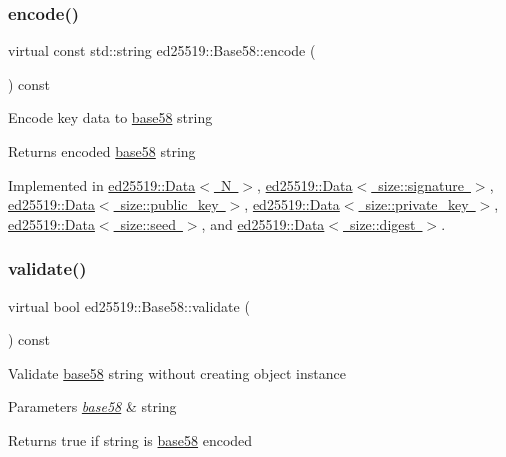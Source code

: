 \subsubsection{\texorpdfstring{encode()}{encode()}}
{\footnotesize\ttfamily virtual const std\+::string ed25519\+::\+Base58\+::encode (\begin{DoxyParamCaption}{ }\end{DoxyParamCaption}) const\hspace{0.3cm}{\ttfamily [pure virtual]}}

Encode key data to \mbox{\hyperlink{namespaceed25519_1_1base58}{base58}} string \begin{DoxyReturn}{Returns}
encoded \mbox{\hyperlink{namespaceed25519_1_1base58}{base58}} string 
\end{DoxyReturn}


Implemented in \mbox{\hyperlink{classed25519_1_1_data_a2dc2e23b950a10b168d7509a63ffca53}{ed25519\+::\+Data$<$ N $>$}}, \mbox{\hyperlink{classed25519_1_1_data_a2dc2e23b950a10b168d7509a63ffca53}{ed25519\+::\+Data$<$ size\+::signature $>$}}, \mbox{\hyperlink{classed25519_1_1_data_a2dc2e23b950a10b168d7509a63ffca53}{ed25519\+::\+Data$<$ size\+::public\+\_\+key $>$}}, \mbox{\hyperlink{classed25519_1_1_data_a2dc2e23b950a10b168d7509a63ffca53}{ed25519\+::\+Data$<$ size\+::private\+\_\+key $>$}}, \mbox{\hyperlink{classed25519_1_1_data_a2dc2e23b950a10b168d7509a63ffca53}{ed25519\+::\+Data$<$ size\+::seed $>$}}, and \mbox{\hyperlink{classed25519_1_1_data_a2dc2e23b950a10b168d7509a63ffca53}{ed25519\+::\+Data$<$ size\+::digest $>$}}.

\mbox{\label{classed25519_1_1_base58_addfdb1d6d0f7e7f0cd0cf5dd2ee193bb}} 
\subsubsection{\texorpdfstring{validate()}{validate()}}
{\footnotesize\ttfamily virtual bool ed25519\+::\+Base58\+::validate (\begin{DoxyParamCaption}{ }\end{DoxyParamCaption}) const\hspace{0.3cm}{\ttfamily [pure virtual]}}

Validate \mbox{\hyperlink{namespaceed25519_1_1base58}{base58}} string without creating object instance 
\begin{DoxyParams}{Parameters}
{\em \mbox{\hyperlink{namespaceed25519_1_1base58}{base58}}} & string \\
\hline
\end{DoxyParams}
\begin{DoxyReturn}{Returns}
true if string is \mbox{\hyperlink{namespaceed25519_1_1base58}{base58}} encoded 
\end{DoxyReturn}


